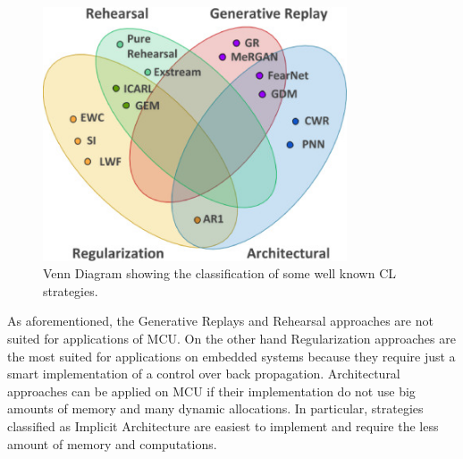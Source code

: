 \documentclass[12pt]{report}
\begin{document}
\begin{figure}[h!]
    \centering
    \includegraphics[width=90mm]{Figures/Chapter1/CL_algorithms.jpg} 
    \caption{Venn Diagram showing the classification of some well known CL strategies.}
    \label{fig:CLstrategies}    
\end{figure}  

As aforementioned, the Generative Replays and Rehearsal approaches are not suited for applications of MCU. On the other hand Regularization approaches are the most suited for applications on embedded systems because they require just a smart implementation of a control over back propagation. Architectural approaches can be applied on MCU if their implementation do not use big amounts of memory and many dynamic allocations. In particular, strategies classified as Implicit Architecture are easiest to implement and require the less amount of memory and computations.\\
\end{document}
